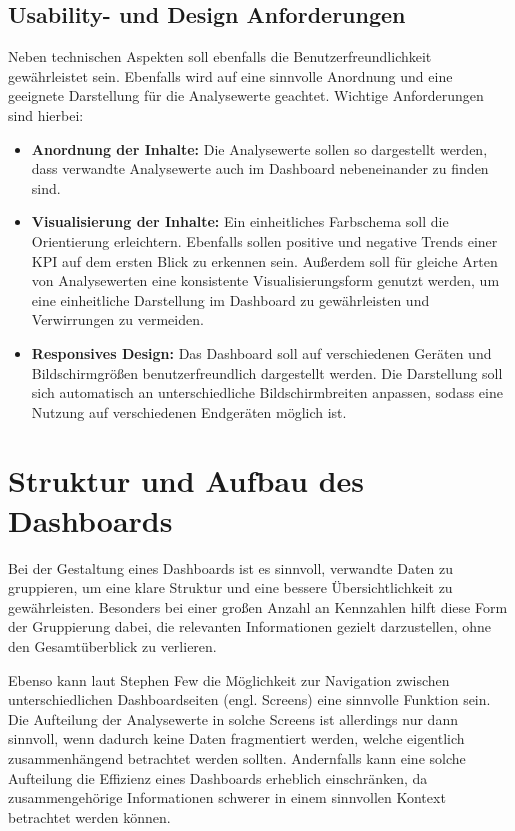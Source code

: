 \subsection{Usability- und Design Anforderungen}
\label{sssec:usability}
Neben technischen Aspekten soll ebenfalls die Benutzerfreundlichkeit gewährleistet sein. Ebenfalls wird auf eine sinnvolle Anordnung und eine geeignete Darstellung für die Analysewerte geachtet. Wichtige Anforderungen sind hierbei:
\begin{itemize}
    \item \textbf{Anordnung der Inhalte:} Die Analysewerte sollen so dargestellt werden, dass verwandte Analysewerte auch im Dashboard nebeneinander zu finden sind.
    \item \textbf{Visualisierung der Inhalte:} Ein einheitliches Farbschema soll die Orientierung erleichtern. Ebenfalls sollen positive und negative Trends einer KPI auf dem ersten Blick zu erkennen sein. Außerdem soll für gleiche Arten von Analysewerten eine konsistente Visualisierungsform genutzt werden, um eine einheitliche Darstellung im Dashboard zu gewährleisten und Verwirrungen zu vermeiden.
    \item \textbf{Responsives Design:} Das Dashboard soll auf verschiedenen Geräten und Bildschirmgrößen benutzerfreundlich dargestellt werden. Die Darstellung soll sich automatisch an unterschiedliche Bildschirmbreiten anpassen, sodass eine Nutzung auf verschiedenen Endgeräten möglich ist.
\end{itemize}

\section{Struktur und Aufbau des Dashboards}
Bei der Gestaltung eines Dashboards ist es sinnvoll, verwandte Daten zu gruppieren, um eine klare Struktur und eine bessere Übersichtlichkeit zu gewährleisten. Besonders bei einer großen Anzahl an Kennzahlen hilft diese Form der Gruppierung dabei, die relevanten Informationen gezielt darzustellen, ohne den Gesamtüberblick zu verlieren. \parencite[Kap.14.3]{Hassler2019}

Ebenso kann laut Stephen Few die Möglichkeit zur Navigation zwischen unterschiedlichen Dashboardseiten (engl. Screens) eine sinnvolle Funktion sein. Die Aufteilung der Analysewerte in solche Screens ist allerdings nur dann sinnvoll, wenn dadurch keine Daten fragmentiert werden, welche eigentlich zusammenhängend betrachtet werden sollten. Andernfalls kann eine solche Aufteilung die Effizienz eines Dashboards erheblich einschränken, da zusammengehörige Informationen schwerer in einem sinnvollen Kontext betrachtet werden können. \parencite[Kap.3.1.1]{Few2006}

